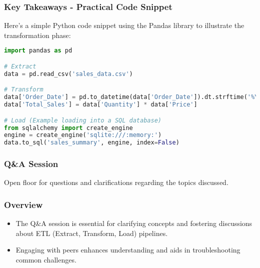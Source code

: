 \documentclass[aspectratio=169]{beamer}
\begin{document}
\begin{frame}[fragile]
    \frametitle{Key Takeaways - Practical Code Snippet}
    Here’s a simple Python code snippet using the Pandas library to illustrate the transformation phase:
    
    \begin{lstlisting}[language=Python]
import pandas as pd

# Extract
data = pd.read_csv('sales_data.csv')

# Transform
data['Order_Date'] = pd.to_datetime(data['Order_Date']).dt.strftime('%Y-%m-%d')
data['Total_Sales'] = data['Quantity'] * data['Price']

# Load (Example loading into a SQL database)
from sqlalchemy import create_engine
engine = create_engine('sqlite:///:memory:')
data.to_sql('sales_summary', engine, index=False)
    \end{lstlisting}
\end{frame}

\begin{frame}[fragile]
    \frametitle{Q\&A Session}
    Open floor for questions and clarifications regarding the topics discussed.
\end{frame}

\begin{frame}[fragile]
    \frametitle{Overview}
    \begin{itemize}
        \item The Q\&A session is essential for clarifying concepts and fostering discussions about ETL (Extract, Transform, Load) pipelines.
        \item Engaging with peers enhances understanding and aids in troubleshooting common challenges.
    \end{itemize}
\end{frame}
\end{document}
